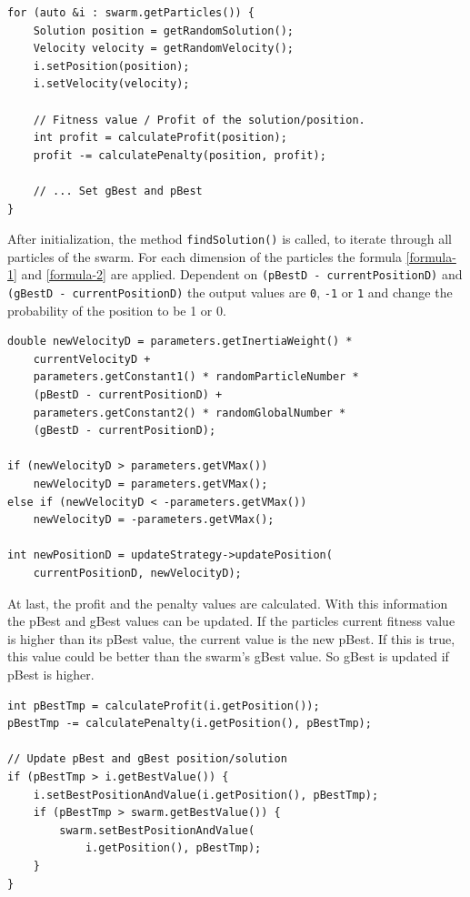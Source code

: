\documentclass{article}
\begin{document}
\begin{lstlisting}[caption="Solver.cpp"]
for (auto &i : swarm.getParticles()) {
	Solution position = getRandomSolution();
   	Velocity velocity = getRandomVelocity();
	i.setPosition(position);
	i.setVelocity(velocity);
	
	// Fitness value / Profit of the solution/position.
	int profit = calculateProfit(position);
	profit -= calculatePenalty(position, profit);
	
	// ... Set gBest and pBest
}
\end{lstlisting}

After initialization, the method \lstinline$findSolution()$ is called, to iterate through all particles of the swarm. For each dimension of the particles the formula \ref{formula-1} and \ref{formula-2} are applied. Dependent on \lstinline{(pBestD - currentPositionD)} and \lstinline{(gBestD - currentPositionD)} the output values are \lstinline$0$, \lstinline$-1$ or \lstinline$1$ and change the probability of the position to be 1 or 0.\\

\begin{lstlisting}[caption="Solver.cpp"]
double newVelocityD = parameters.getInertiaWeight() *
	currentVelocityD +
	parameters.getConstant1() * randomParticleNumber *
	(pBestD - currentPositionD) +
	parameters.getConstant2() * randomGlobalNumber *
	(gBestD - currentPositionD);

if (newVelocityD > parameters.getVMax())
    newVelocityD = parameters.getVMax();
else if (newVelocityD < -parameters.getVMax())
    newVelocityD = -parameters.getVMax();

int newPositionD = updateStrategy->updatePosition(
	currentPositionD, newVelocityD);
\end{lstlisting}

At last, the profit and the penalty values are calculated. With this information the pBest and gBest values can be updated. If the particles current fitness value is higher than its pBest value, the current value is the new pBest. If this is true, this value could be better than the swarm's gBest value. So gBest is updated if pBest is higher.\\

\begin{lstlisting}[caption="Solver.cpp"]
int pBestTmp = calculateProfit(i.getPosition());
pBestTmp -= calculatePenalty(i.getPosition(), pBestTmp);

// Update pBest and gBest position/solution
if (pBestTmp > i.getBestValue()) {
	i.setBestPositionAndValue(i.getPosition(), pBestTmp);
	if (pBestTmp > swarm.getBestValue()) {
	    swarm.setBestPositionAndValue(
	    	i.getPosition(), pBestTmp);
	}
}
\end{lstlisting}
\end{document}
